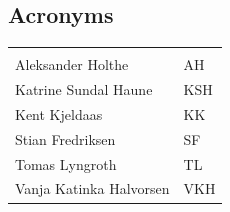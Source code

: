 \documentclass{article}
\begin{document}
\vspace*{3 cm}

\begin{center}
\section*{\textbf{Acronyms}}
\begin{tabular}{l|l}
\rowcolor{cadetgrey}
    &   \\
Aleksander Holthe      & AH     
 \\\rowcolor{gainsboro}
Katrine Sundal Haune  & KSH \\
Kent Kjeldaas         & KK 
 \\\rowcolor{gainsboro}
Stian Fredriksen      & SF  \\
Tomas Lyngroth       & TL   
 \\\rowcolor{gainsboro}
Vanja Katinka Halvorsen     & VKH   \\
\end{tabular}                                                  
\end{center}
\end{document}
